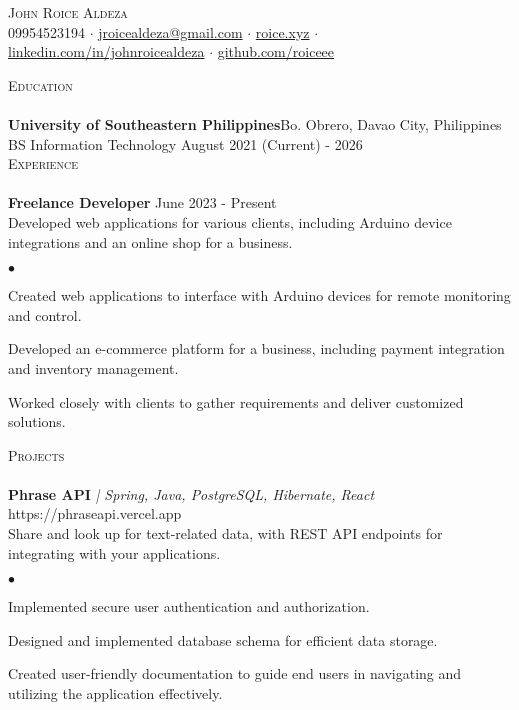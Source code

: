 \documentclass[a4paper]{article}
\newcommand{\lineunder} {
        \vspace*{-8pt} \\
        \hspace*{-18pt} \hrulefill \\
    }
\newcommand{\header} [1] {
        {\vspace*{4mm} \hspace*{-18pt}\vspace*{8pt} \textsc{#1}}
        \vspace*{-6pt} \lineunder
    }
\newenvironment{achievements}{
        \begin{list}
            {$\bullet$}{\topsep 0pt \itemsep -2pt}}{\vspace*{4pt}
        \end{list}
    }
\begin{document}
    \vspace*{-40pt}

    \begin{center}
        {\Huge \scshape {John Roice Aldeza}}\\
        \vspace{2mm}
    09954523194 $\cdot$ \href{mailto:jroicealdeza@gmail.com}{jroicealdeza@gmail.com} $\cdot$ \href{https://roice.xyz}{roice.xyz} $\cdot$ \href{https://www.linkedin.com/in/johnroicealdeza}{linkedin.com/in/johnroicealdeza} $\cdot$ 
    \href{https://www.github.com/roiceee}{github.com/roiceee}
    \end{center}
    \vspace{-8pt}
    \header{Education}
    \textbf{University of Southeastern Philippines}\hfill Bo. Obrero, Davao City, Philippines\\
    BS Information Technology \hfill August 2021 (Current) - 2026\\

    \header{Experience}

    {\textbf{Freelance Developer}} \hfill June 2023 - Present\\
    \vspace{1mm}
    Developed web applications for various clients, including Arduino device integrations and an online shop for a business.\\
    \begin{achievements}
        \item Created web applications to interface with Arduino devices for remote monitoring and control.
        \item Developed an e-commerce platform for a business, including payment integration and inventory management.
        \item Worked closely with clients to gather requirements and deliver customized solutions.
    \end{achievements}
    \vspace*{3mm}
   \vspace{-8pt}
    \header{Projects}

    {\textbf{Phrase API}} {\sl | Spring, Java, PostgreSQL, Hibernate, React} \hfill https://phraseapi.vercel.app\\
    \vspace{1mm}
    Share and look up for text-related data, with REST API endpoints for integrating with your applications.\\
    \begin{achievements}
        \item Implemented secure user authentication and authorization.
        \item Designed and implemented database schema for efficient data storage.
        \item Created user-friendly documentation to guide end users in navigating and utilizing the application effectively.
    \end{achievements}
    \vspace*{3mm}
\end{document}
